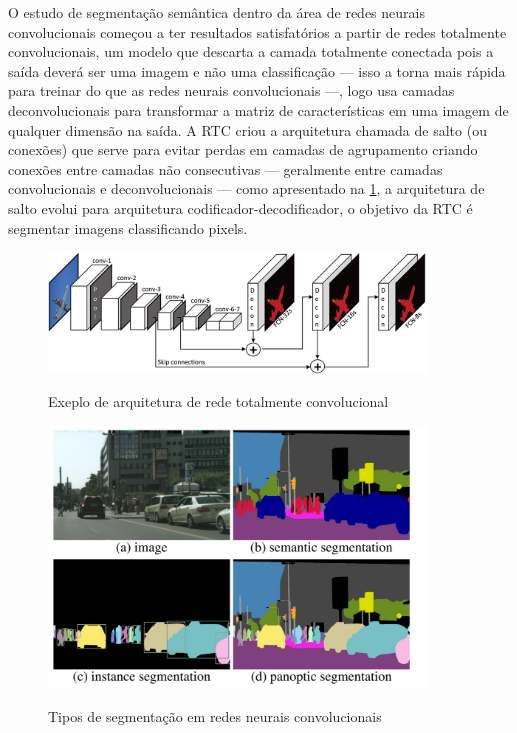 O estudo de segmentação semântica dentro da área de redes neurais convolucionais começou a ter resultados satisfatórios a partir de redes totalmente convolucionais, um modelo que descarta a camada totalmente conectada pois a saída deverá ser uma imagem e não uma classificação — isso a torna mais rápida para treinar do que as redes neurais convolucionais —, logo usa camadas deconvolucionais para transformar a matriz de características em uma imagem de qualquer dimensão na saída. A RTC criou a arquitetura chamada de salto (ou conexões) que serve para evitar perdas em camadas de agrupamento criando conexões entre camadas não consecutivas — geralmente entre camadas convolucionais e deconvolucionais — como apresentado na \cref{fig:rtc}, a arquitetura de salto evolui para arquitetura codificador-decodificador, o objetivo da RTC é segmentar imagens classificando pixels.
\begin{figure}[H]
	\caption{Exeplo de arquitetura de rede totalmente convolucional}
	\centering %
	\includegraphics[width=10cm]{figures/redes_totalmente_convolucionais.jpeg} %
	\label{fig:rtc}
\end{figure}


\begin{figure}[H]
	\caption{Tipos de segmentação em redes neurais convolucionais}
	\centering %
	\includegraphics[width=10cm]{figures/segmantations.png} %
	\label{fig:segentacoes}
\end{figure}


